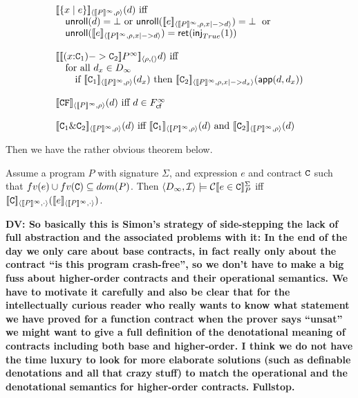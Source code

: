 \documentclass[preprint,nocopyrightspace,draft]{sigplanconf}
\begin{document}
\[\begin{array}{l}
    \interp{\{x \mid e\}}{\dbrace{P}^\infty}{\rho}(d) \text{ iff } \\
        \quad \unroll(d) = \bot \text{ or } 
        \unroll(\interp{e}{\dbrace{P}^\infty}{\rho,x|->d}) = \bot\;\text{ or } \\
        \quad \unroll(\interp{e}{\dbrace{P}^\infty}{\rho,x|->d}) = \ret(\inj{\mathop{True}}(1)) \\ \\
    \interp{\dbrace{(x{:}\Ct_1) -> \Ct_2}{P}^\infty}{\rho}(d) \text{ iff } \\
        \quad \text{for all } d_x \in D_\infty \\ 
        \quad\quad \text{if }
                     \interp{\Ct_1}{\dbrace{P}^\infty}{\rho}(d_x)\text{ then }
                     \interp{\Ct_2}{\dbrace{P}^\infty}{\rho,x|->d_x}(\dapp(d,d_x)) \\ \\ 
    \interp{\CF}{\dbrace{P}^\infty}{\rho}(d) \text{ iff }  d \in \Fcf^{\infty} \\  \\ 
    \interp{\Ct_1 \& \Ct_2}{\dbrace{P}^\infty}{\rho}(d) \text{ iff } 
       \interp{\Ct_1}{\dbrace{P}^\infty}{\rho}(d) \text{ and } 
       \interp{\Ct_2}{\dbrace{P}^\infty}{\rho}(d)
\end{array}\]

Then we have the rather obvious theorem below.

\begin{theorem}
Assume a program $P$ with signature $\Sigma$, and expression $e$ and contract $\Ct$ 
such that $fv(e) \cup fv(\Ct) \subseteq dom(P)$. Then 
$\langle D_\infty,{\cal I}\rangle \models \ctrans{\Sigma}{P}{e \in \Ct}$ iff
$\interp{\Ct}{\dbrace{P}^{\infty}}{\cdot}(\interp{e}{\dbrace{P}^\infty}{\cdot})$.
\end{theorem}


{\bf DV: So basically this is Simon's strategy of side-stepping the lack of full abstraction
and the associated problems with it: In the end of the day we only care about base contracts,
in fact really only about the contract ``is this program crash-free'', so we don't have to make
a big fuss about higher-order contracts and their operational semantics. We have to motivate it
carefully and also be clear that for the intellectually curious reader who really wants to know what statement we have proved for a function contract when the prover says ``unsat'' we might want to give a full definition of the denotational meaning of contracts including both base and higher-order. I think we do not have the time luxury to look for more elaborate solutions (such as definable denotations and all that crazy stuff) to match the operational and the denotational semantics for higher-order contracts. Fullstop.}
\end{document}
